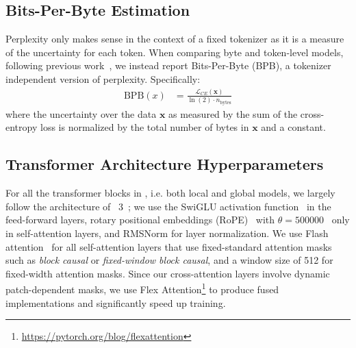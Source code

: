 \documentclass[]{fairmeta}
\begin{document}
\subsection{Bits-Per-Byte Estimation}
Perplexity only makes sense in the context of a fixed tokenizer as it is a measure of the uncertainty for each token. When comparing byte and token-level models, following previous work~\citep{xue2022byt5, yu2023megabyte, wang2024mambabyte}, we instead report Bits-Per-Byte (BPB), a tokenizer independent version of perplexity. Specifically:
\begin{align}
    \text{BPB}(x)&= \frac{\mathcal{L}_{CE}(\pmb{x})}{\ln(2)\cdot n_{\text{bytes}}}
\end{align}
where the uncertainty over the data $\pmb{x}$ as measured by the sum of the cross-entropy loss is normalized by the total number of bytes in $\pmb{x}$ and a constant. 


\subsection{Transformer Architecture Hyperparameters} For all the transformer blocks in \model{}, i.e. both local and global models, we largely follow the architecture of \llama{}~3~\citep{dubey2024llama}; we use the SwiGLU activation function~\citep{swiglu} in the feed-forward layers, rotary positional embeddings (RoPE)~\citep{RoPe} with $\theta=500000$~\citep{xiong2024effective} only in self-attention layers, and RMSNorm \citep{RMSNorm} for layer normalization. We use Flash attention~\citep{dao2022flashattention} for all self-attention layers that use fixed-standard attention masks such as \textit{block causal} or \textit{fixed-window block causal}, and a window size of 512 for fixed-width attention masks. Since our cross-attention layers involve dynamic patch-dependent masks, we use Flex Attention\footnote{\url{https://pytorch.org/blog/flexattention}} to produce fused implementations and significantly speed up training.
\end{document}
